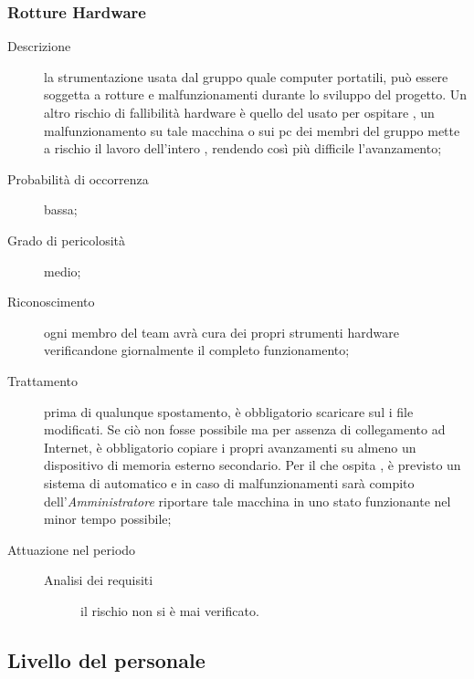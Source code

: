		\subsubsection{Rotture Hardware}
		\begin{description}
			\item[Descrizione] la strumentazione usata dal gruppo quale computer portatili, può essere soggetta a rotture e malfunzionamenti durante lo sviluppo del progetto. Un altro rischio di fallibilità hardware è quello del  usato per ospitare 				, un malfunzionamento su tale macchina o sui pc dei membri del gruppo mette a rischio il lavoro dell'intero , rendendo così più difficile l'avanzamento;
			\item[Probabilità di occorrenza] bassa;
			\item[Grado di pericolosità] medio;
			\item[Riconoscimento] ogni membro del team avrà cura dei propri strumenti hardware verificandone giornalmente il completo funzionamento;
			\item[Trattamento] prima di qualunque spostamento, è obbligatorio scaricare sul   i file modificati. Se ciò non fosse possibile ma per assenza di collegamento ad Internet, è obbligatorio copiare i propri avanzamenti su almeno un dispositivo di memoria esterno secondario. Per il  che ospita , è previsto un sistema di  automatico e in caso di malfunzionamenti sarà compito dell’\emph{Amministratore} riportare tale macchina in uno stato funzionante nel minor tempo possibile; 
			\item[Attuazione nel periodo]
			\begin{description}
				\item[Analisi dei requisiti] il rischio non si è mai verificato.
			\end{description}
		\end{description}
	\subsection{Livello del personale} \label{sec:per}
